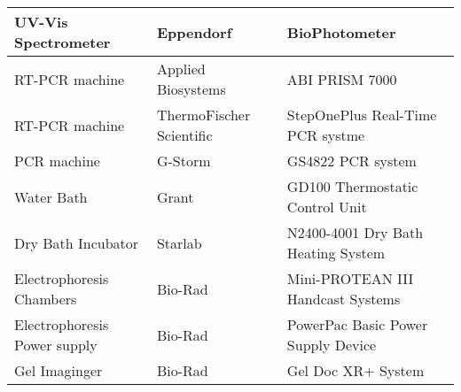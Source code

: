 \begin{longtable}{ |L{3cm}|C{4cm}|C{6.5cm}|}
		\hline
		UV-Vis Spectrometer & Eppendorf  & BioPhotometer \\
		\hline
		RT-PCR machine & Applied Biosystems & ABI PRISM 7000 \\
		\hline
		RT-PCR machine & ThermoFischer Scientific & StepOnePlus Real-Time PCR systme \\
		\hline
		PCR machine & G-Storm &  GS4822 PCR system \\
		\hline
		Water Bath & Grant & GD100 Thermostatic Control Unit \\
		\hline
		Dry Bath Incubator & Starlab & N2400-4001 Dry Bath Heating System \\
		\hline
		Electrophoresis Chambers & Bio-Rad & Mini-PROTEAN III Handcast Systems \\
		\hline
		Electrophoresis Power supply & Bio-Rad & PowerPac Basic Power Supply Device\\
		\hline
		Gel Imaginger & Bio-Rad & Gel Doc XR+ System \\
		\hline
	\end{longtable}


